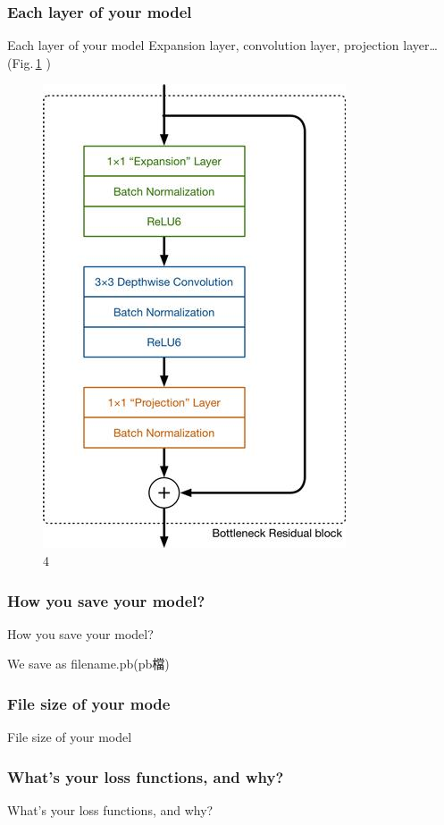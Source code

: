 \documentclass{beamer}
\begin{document}
\subsubsection{Each layer of your model }
\begin{frame}{Each layer of your model }
	Expansion layer, convolution layer, projection layer… (Fig.\,\ref{fig:4} )
  \begin{figure}
    \includegraphics[width=0.3\linewidth]{layer.jpg}
    \caption{4}
    \label{fig:4}
  \end{figure}
\end{frame}

\subsubsection{How you save your model? }
\begin{frame}{How you save your model? }
  \begin{CJK}{UTF8}{bkai}
	We save as filename.pb(pb檔)
   \end{CJK}
\end{frame}

\subsubsection{File size of your mode }
\begin{frame}{File size of your model }

\end{frame}

\subsubsection{What's your loss functions, and why?}
\begin{frame}{What's your loss functions, and why?}

\end{frame}
\end{document}
